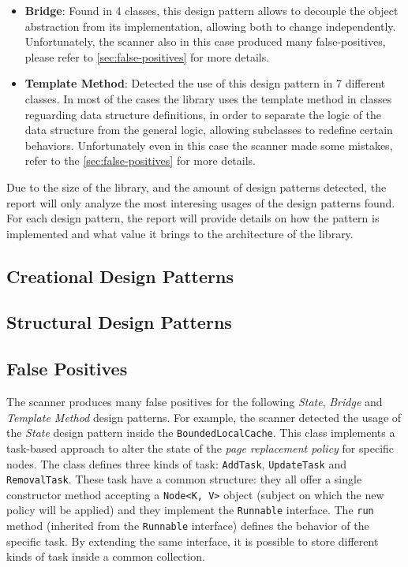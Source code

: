 \begin{itemize}
	\item \textbf{Bridge}: Found in 4 classes, this design pattern allows to decouple the object abstraction from its implementation, allowing both to change independently. Unfortunately, the scanner also in this case produced many false-positives, please refer to \autoref{sec:false-positives} for more details.

	\item \textbf{Template Method}: Detected the use of this design pattern in 7 different classes. In most of the cases the library uses the template method in classes reguarding data structure definitions, in order to separate the logic of the data structure from the general logic, allowing subclasses to redefine certain behaviors. Unfortunately even in this case the scanner made some mistakes, refer to the \autoref{sec:false-positives} for more details.

\end{itemize}

\noindent Due to the size of the library, and the amount of design patterns detected, the report will only analyze the most interesing usages of the design patterns found. For each design pattern, the report will provide details on how the pattern is implemented and what value it brings to the architecture of the library.

\subsection{Creational Design Patterns}



\subsection{Structural Design Patterns}



\subsection{False Positives}
\label{sec:false-positives}

The scanner produces many false positives for the following \textit{State}, \textit{Bridge} and \textit{Template Method} design patterns. For example, the scanner detected the usage of the \textit{State} design pattern inside the \texttt{BoundedLocalCache}. This class implements a task-based approach to alter the state of the \textit{page replacement policy} for specific nodes. The class defines three kinds of task: \texttt{AddTask}, \texttt{UpdateTask} and \texttt{RemovalTask}. These task have a common structure: they all offer a single constructor method accepting a \texttt{Node<K, V>} object (subject on which the new policy will be applied) and they implement the \texttt{Runnable} interface. The \texttt{run} method (inherited from the \texttt{Runnable} interface) defines the behavior of the specific task. By extending the same interface, it is possible to store different kinds of task inside a common collection.

